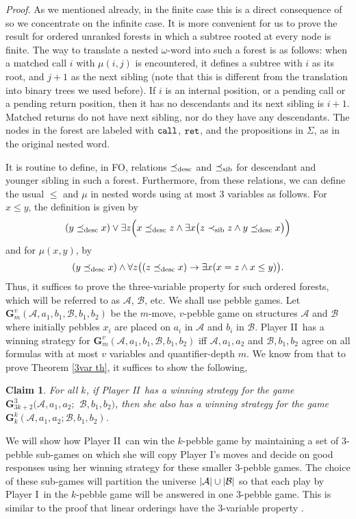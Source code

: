\documentclass{LMCS}
\newcommand{\dupl}{Player II}
\newcommand{\spoiler}{Player I}
\newcommand{\M}{{\mu}}
\newcommand{\desc}{\preceq_{\rm desc}}\newcommand{\sib}{\preceq_{\rm sib}}\newcommand{\lsib}{\prec_{\rm sib}}
\newcommand{\A}{{\mathcal{A}}}
\newcommand{\B}{{\mathcal{B}}}
\newcommand{\G}{{\mathbf G}}
\newcommand{\FO}{{\rm FO}}
\theoremstyle{plain}
\newtheorem{claim}[theorem]{Claim}
\theoremstyle{definition}
\newcommand{\retr}{\mathit{ret}}
\newcommand{\rett}{{\tt ret}}
\newcommand{\call}{{\tt call}}
\renewcommand{\retr}{\rett}
\begin{document}
{\em Proof}.
As we mentioned already, in the finite case this is a direct
consequence of \cite{marx-tods} so we concentrate on the infinite
case.  
It is more convenient for us to prove the result for ordered
unranked forests in which a subtree rooted at every node is
finite. The way to translate a nested $\omega$-word into such a
forest is as follows: when a 
matched call $i$ with $\M(i,j)$ is encountered,
it defines a subtree with $i$ as its root, and $j+1$ as the next
sibling (note that this is different from the translation into binary
trees we used before). 
If $i$ is an internal position, or a pending call or a pending
return position, then it has no descendants and its next sibling is $i+1$.
Matched returns do not have next sibling, nor do they have any descendants.
The nodes in the forest are labeled with $\call$, $\retr$,
and the propositions in $\Sigma$, as in the original nested word.


It is routine to define, in \FO, relations $\desc$ and $\sib$ for 
descendant and younger sibling in such a forest. Furthermore, from
these relations, we can define the usual $\leq$ and $\M$ in nested
words using at most $3$ variables as follows. For $x \leq y$, the
definition is given by
$$(y \desc x) \vee \exists z\Big(x \desc z \wedge \exists x\big(z
\lsib z \wedge y \desc x\big)\Big)$$
and for $\mu(x,y)$, by
$$(y \desc x) \wedge \forall z\big((z \desc x) \to \exists x(x=z
\wedge x \leq y)\big).$$ 
Thus, it suffices to prove the three-variable property for such
ordered forests, which will be referred to as $\A$, $\B$, etc.
We shall use pebble games. Let 
$\G^v_m(\A, a_1,b_1,\B,b_1,b_2)$ be the $m$-move, $v$-pebble game on structures $\A$
and $\B$ where initially pebbles $x_i$ are placed on $a_i$ in $\A$ and
$b_i$ in $\B$.  \dupl\ has a winning strategy for $\G^v_m(\A,
a_1,b_1,\B,b_1,b_2)$ iff $\A,a_1,a_2$ and $\B,b_1,b_2$ agree on all
formulas with at most $v$ variables and quantifier-depth $m$.  
We know from \cite{IK}
that to prove Theorem \ref{3var th}, it suffices to show
the following,

\begin{claim}
For all $k$, if \dupl\ has a winning strategy for the game
$\G^3_{3k+2}(\A,a_1,a_2;$ $\B,b_1,b_2)$, then she also has a winning
strategy for the game $\G^k_{k}(\A,a_1,a_2;\B,b_1,b_2)$.
\end{claim}

We will show how \dupl\ can win the $k$-pebble game by maintaining a
set of 3-pebble sub-games on which she will copy \spoiler's
moves and decide on good responses using her winning strategy for
these smaller 3-pebble games.   The choice of these sub-games will
partition the universe $\abs{\A}\cup\abs{\B}$ so that each play by
\spoiler\ in the $k$-pebble game will be answered in one $3$-pebble
game.  This is similar to the proof that linear orderings have the
3-variable property \cite{IK}.
\end{document}
